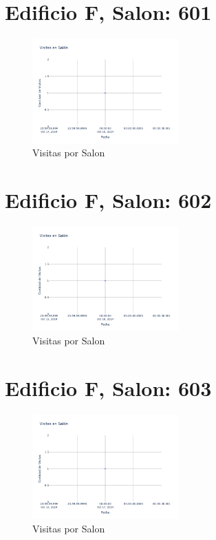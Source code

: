 \documentclass{article}
\begin{document}
    

    \section{Edificio F, Salon: 601}
    \begin{figure}
        \centering
        \includegraphics[width=0.5\textwidth]{../img/poli/VS601-90Dias-03-12-2024.png}
        \caption{Visitas por Salon}
    \end{figure}

    

    \section{Edificio F, Salon: 602}
    \begin{figure}
        \centering
        \includegraphics[width=0.5\textwidth]{../img/poli/VS602-90Dias-03-12-2024.png}
        \caption{Visitas por Salon}
    \end{figure}

    

    \section{Edificio F, Salon: 603}
    \begin{figure}
        \centering
        \includegraphics[width=0.5\textwidth]{../img/poli/VS603-90Dias-03-12-2024.png}
        \caption{Visitas por Salon}
    \end{figure}
\end{document}
